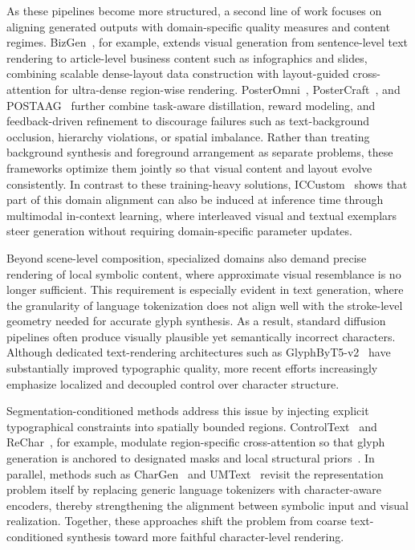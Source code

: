 \documentclass{llmxive}
\begin{document}
As these pipelines become more structured, a second line of work focuses on aligning generated outputs with domain-specific quality measures and content regimes. BizGen~\citep{peng2025bizgen}, for example, extends visual generation from sentence-level text rendering to article-level business content such as infographics and slides, combining scalable dense-layout data construction with layout-guided cross-attention for ultra-dense region-wise rendering. PosterOmni~\citep{Chen2026PosterOmniGA}, PosterCraft~\citep{Chen2025PosterCraftRH}, and POSTAAG~\citep{Chen2025POSTAAG} further combine task-aware distillation, reward modeling, and feedback-driven refinement to discourage failures such as text-background occlusion, hierarchy violations, or spatial imbalance. Rather than treating background synthesis and foreground arrangement as separate problems, these frameworks optimize them jointly so that visual content and layout evolve consistently. In contrast to these training-heavy solutions, ICCustom~\citep{Li2025ICCustomDI} shows that part of this domain alignment can also be induced at inference time through multimodal in-context learning, where interleaved visual and textual exemplars steer generation without requiring domain-specific parameter updates.


Beyond scene-level composition, specialized domains also demand precise rendering of local symbolic content, where approximate visual resemblance is no longer sufficient. This requirement is especially evident in text generation, where the granularity of language tokenization does not align well with the stroke-level geometry needed for accurate glyph synthesis. As a result, standard diffusion pipelines often produce visually plausible yet semantically incorrect characters. Although dedicated text-rendering architectures such as GlyphByT5-v2~\citep{Liu2024GlyphByT5v2AS} have substantially improved typographic quality, more recent efforts increasingly emphasize localized and decoupled control over character structure.

Segmentation-conditioned methods address this issue by injecting explicit typographical constraints into spatially bounded regions. ControlText~\citep{Jiang2025ControlTextUC} and ReChar~\citep{Rechar}, for example, modulate region-specific cross-attention so that glyph generation is anchored to designated masks and local structural priors~\citep{Lu2025EasyTextCD, PaCaNet}. In parallel, methods such as CharGen~\citep{Ma2024CharGenHA} and UMText~\citep{Ma2026UMTextAU} revisit the representation problem itself by replacing generic language tokenizers with character-aware encoders, thereby strengthening the alignment between symbolic input and visual realization. Together, these approaches shift the problem from coarse text-conditioned synthesis toward more faithful character-level rendering.
\end{document}
